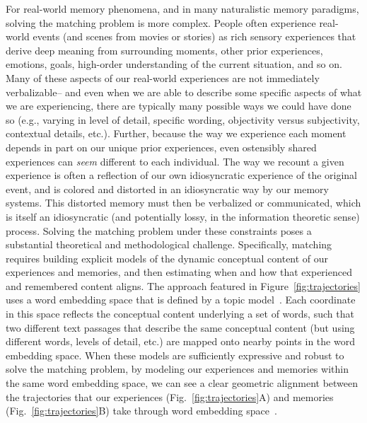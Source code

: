\documentclass{article}
\begin{document}
For real-world memory phenomena, and in many naturalistic memory paradigms, solving the matching problem is more complex.  People often experience real-world events (and scenes from movies or stories) as rich sensory experiences that derive deep meaning from surrounding moments, other prior experiences, emotions, goals, high-order understanding of the current situation, and so on.  Many of these aspects of our real-world experiences are not immediately verbalizable-- and even when we are able to describe some specific aspects of what we are experiencing, there are typically many possible ways we could have done so (e.g., varying in level of detail, specific wording, objectivity versus subjectivity, contextual details, etc.).  Further, because the way we experience each moment depends in part on our unique prior experiences, even ostensibly shared experiences can \textit{seem} different to each individual.  The way we recount a given experience is often a reflection of our own idiosyncratic experience of the original event, and is colored and distorted in an idiosyncratic way by our memory systems.  This distorted memory must then be verbalized or communicated, which is itself an idiosyncratic (and potentially lossy, in the information theoretic sense) process.  Solving the matching problem under these constraints poses a substantial theoretical and methodological challenge.  Specifically, matching requires building explicit models of the dynamic conceptual content of our experiences and memories, and then estimating when and how that experienced and remembered content aligns.  The approach featured in Figure~\ref{fig:trajectories} uses a word embedding space that is defined by a topic model~\citep{BleiEtal03}.  Each coordinate in this space reflects the conceptual content underlying a set of words, such that two different text passages that describe the same conceptual content (but using different words, levels of detail, etc.) are mapped onto nearby points in the word embedding space.  When these models are sufficiently expressive and robust to solve the matching problem, by modeling our experiences and memories within the same word embedding space, we can see a clear geometric alignment between the trajectories that our experiences (Fig.~\ref{fig:trajectories}A) and memories (Fig.~\ref{fig:trajectories}B) take through word embedding space~\citep[also see][]{HeusEtal18c}.
\end{document}
